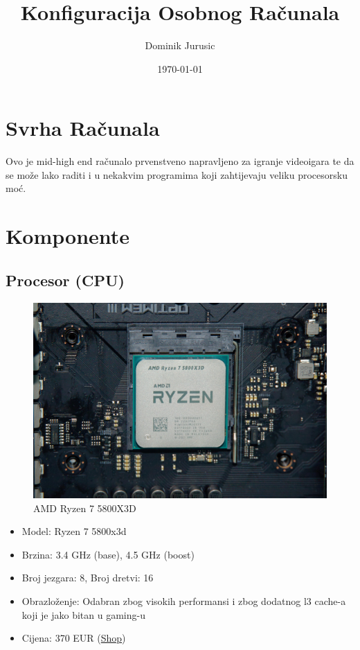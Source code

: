 \documentclass{article}
\title{Konfiguracija Osobnog Računala}
\author{Dominik Jurusic}
\date{\today}
\begin{document}
\maketitle
\tableofcontents
\listoffigures
\pagebreak



\section{Svrha Računala}
Ovo je mid-high end računalo prvenstveno napravljeno za igranje videoigara te da se može lako raditi i u nekakvim programima koji zahtijevaju veliku procesorsku moć.

\section{Komponente}

\subsection{Procesor (CPU)}
\begin{figure}[H]
    \centering
    \includegraphics[width = \textwidth]{Slike/CPU.jpg}
    \caption{AMD Ryzen 7 5800X3D}
    \label{fig:Procesor}
\end{figure}
\begin{itemize}
    \item Model: Ryzen 7 5800x3d
    \item Brzina: 3.4 GHz (base), 4.5 GHz (boost)
    \item Broj jezgara: 8, Broj dretvi: 16
    \item Obrazloženje: Odabran zbog visokih performansi i zbog dodatnog l3 cache-a koji je jako bitan u gaming-u
    \item Cijena: 370 EUR (\href{https://www.adm.hr/cpu-amd-ryzen-7-5800x3d-box-am4-100-100000651wof/72892/product/}{Shop})
\end{itemize}
\end{document}
